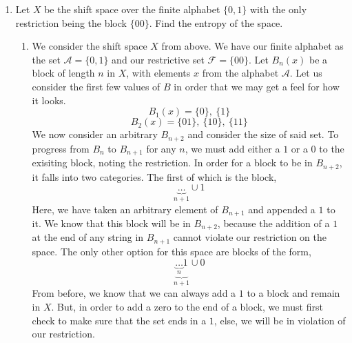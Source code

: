 \documentclass[letterpaper,10pt]{article}
\begin{document}
\begin{enumerate}
\begin{proof}
\[a_p\leq ka_n+a_r\leq ka_n+\mu\]
We now divide this equality to obtain a more familiar form,
\[\frac{a_p}{p}\leq \frac{ka_n}{p}+\frac{\mu}{p}\]
From before, we know that $a_n$ is strictly bounded by $(M+\delta)n$. So, we may write,
\[\frac{a_p}{p}< \frac{kn(M+\delta)}{p}+\frac{\mu}{p}\]
Finally, we take the limit as $p\to \infty$. On the right, we may clearly see that $\mu/p$ will tend to zero as $p$ increases. This leaves
\[\lim_{p\to \infty}\frac{kn}{p}(M+\delta)\]
From our definition of $p$, we see that this fraction will simplify to $1$ in the limit, and then we are left with $M+\delta$. So,
\[\lim_{p\to \infty} \frac{a_p}{p}<M+\delta\]
Because $\delta$ is arbitrary, we may allow it to be very small, resulting in our limit being bounded above by the smallest value of the original sequence $a_n/n$. Because $M$ exists and is finite, we know that the limit is finite as well.
\end{proof}
\newpage
\addtocounter{enumi}{1}
\item Let $X$ be the shift space over the finite alphabet $\{0,1\}$ with the only restriction being the block $\{00\}$. Find the entropy of the space.
\begin{enumerate}
\item We consider the shift space $X$ from above. We have our finite alphabet as the set $\mathcal{A}=\{0,1\}$ and our restrictive set $\mathcal{F}=\{00\}$. Let $B_n(x)$ be a block of length $n$ in $X$, with elements $x$ from the alphabet $\mathcal{A}$. Let us consider the first few values of $B$ in order that we may get a feel for how it looks.
\[B_1(x)=\{0\},\ \{1\}\]
\[B_2(x)=\{01\},\ \{10\},\ \{11\}\]
We now consider an arbitrary $B_{n+2}$ and consider the size of said set. To progress from $B_n$ to $B_{n+1}$ for any $n$, we must add either a $1$ or a $0$ to the exisiting block, noting the restriction.  In order for a block to be in $B_{n+2}$, it falls into two categories. The first of which is the block,
\[\underbrace{\ldots}_{n+1}\cup 1\]
Here, we have taken an arbitrary element of $B_{n+1}$ and appended a $1$ to it. We know that this block will be in $B_{n+2}$, because the addition of a $1$ at the end of any string in $B_{n+1}$ cannot violate our restriction on the space. The only other option for this space are blocks of the form,
\[\underbrace{\underbrace{\ldots }_{n}1}_{n+1}\cup 0\]
From before, we know that we can always add a $1$ to a block and remain in $X$. But, in order to add a zero to the end of a block, we must first check to make sure that the set ends in a $1$, else, we will be in violation of our restriction.\\

\end{enumerate}
\end{enumerate}
\end{document}
